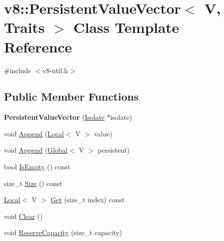 \hypertarget{classv8_1_1_persistent_value_vector}{}\section{v8\+:\+:Persistent\+Value\+Vector$<$ V, Traits $>$ Class Template Reference}
\label{classv8_1_1_persistent_value_vector}


{\ttfamily \#include $<$v8-\/util.\+h$>$}

\subsection*{Public Member Functions}
\begin{DoxyCompactItemize}
\item 
{\bfseries Persistent\+Value\+Vector} (\hyperlink{classv8_1_1_isolate}{Isolate} $\ast$isolate)\hypertarget{classv8_1_1_persistent_value_vector_ab6b9994133c30359ad7a02d3cc05219c}{}\label{classv8_1_1_persistent_value_vector_ab6b9994133c30359ad7a02d3cc05219c}

\item 
void \hyperlink{classv8_1_1_persistent_value_vector_a02376c6d16be29084db46f65473477fb}{Append} (\hyperlink{classv8_1_1_local}{Local}$<$ V $>$ value)
\item 
void \hyperlink{classv8_1_1_persistent_value_vector_ad076923fd0046196670e87e996582546}{Append} (\hyperlink{classv8_1_1_global}{Global}$<$ V $>$ persistent)
\item 
bool \hyperlink{classv8_1_1_persistent_value_vector_a9ad869bc3f60fc227fecf202b36b650a}{Is\+Empty} () const 
\item 
size\+\_\+t \hyperlink{classv8_1_1_persistent_value_vector_a0e152d147a2553746e56cbf9e6311506}{Size} () const 
\item 
\hyperlink{classv8_1_1_local}{Local}$<$ V $>$ \hyperlink{classv8_1_1_persistent_value_vector_a7b47cacf60ddfa3e2a7f57d788f18b84}{Get} (size\+\_\+t index) const 
\item 
void \hyperlink{classv8_1_1_persistent_value_vector_ad07f449c2004b4f3d91e58cabde99a53}{Clear} ()
\item 
void \hyperlink{classv8_1_1_persistent_value_vector_ad4cccfee3a275986578276efe0c78510}{Reserve\+Capacity} (size\+\_\+t capacity)
\end{DoxyCompactItemize}
